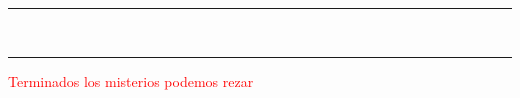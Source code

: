 \documentclass[10pt,twoside]{book}
\begin{document}
\begin{center}
      \begin{spacing}{0.25}
            {\rule{20em}{0.4pt}}\\
            {\rule{20em}{0.4pt}}
      \end{spacing}
\end{center}

\label{final-prayer}
\begin{center}
      \textcolor{red}{Terminados los misterios podemos rezar}
\end{center}

\begin{paracol}{2}

      \begin{leftcolumn}
            
      \end{leftcolumn}
      \begin{otherlanguage}{latin}
            \begin{rightcolumn}
                    
            \end{rightcolumn}
      \end{otherlanguage}


      \begin{leftcolumn*}
            
      \end{leftcolumn*}
      \begin{otherlanguage}{latin}
            \begin{rightcolumn}
                  
            \end{rightcolumn}
      \end{otherlanguage}

      \begin{leftcolumn*}
            
      \end{leftcolumn*}
      \begin{otherlanguage}{latin}
            \begin{rightcolumn}
                  
            \end{rightcolumn}
      \end{otherlanguage}


\end{paracol}
\end{document}
